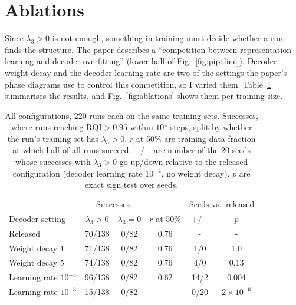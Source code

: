 \section{Ablations}
\label{sec:ablations}

Since $\lambda_3 > 0$ is not enough, something in training must decide whether
a run finds the structure. The paper
describes a ``competition between representation learning and decoder
overfitting'' (lower half of Fig.~\ref{fig:pipeline}). Decoder weight decay and the decoder
learning rate are two of the settings the paper's phase diagrams use to
control this competition, so I varied them. Table~\ref{tab:ablations}
summarises the results, and Fig.~\ref{fig:ablations} shows them per training
size.

\begin{table}[t]
  \centering
  \caption{All configurations, 220 runs each on the same training sets.
  Successes, where runs reaching $\mathrm{RQI}>0.95$ within $10^4$ steps, split by
  whether the run's training set has $\lambda_3>0$. $r$ at 50\% are training
  data fraction at which half of all runs succeed. $+$/$-$ are number of the 20 seeds whose successes with
  $\lambda_3>0$ go up/down relative to the released configuration (decoder
  learning rate $10^{-4}$, no weight decay). $p$ are exact sign test over seeds.}
  \label{tab:ablations}
  \small
  \setlength{\tabcolsep}{4pt}
  \begin{tabular}{@{}lccccc@{}}
    \toprule
    & \multicolumn{2}{c}{Successes} & & \multicolumn{2}{c}{Seeds vs.\ released} \\
    \cmidrule(lr){2-3} \cmidrule(l){5-6}
    Decoder setting & $\lambda_3{>}0$ & $\lambda_3{=}0$ & \shortstack{$r$ at\\50\%} & $+$/$-$ & $p$ \\
    \midrule
    Released & 70/138 & 0/82 & 0.76 & - & - \\
    Weight decay 1   & 71/138 & 0/82 & 0.76 & 1/0  & 1.0 \\
    Weight decay 5   & 74/138 & 0/82 & 0.76 & 4/0  & 0.13 \\
    Learning rate $10^{-5}$ & 96/138 & 0/82 & 0.62 & 14/2 & 0.004 \\
    Learning rate $10^{-3}$ & 15/138 & 0/82 & -   & 0/20 & $2{\times}10^{-6}$ \\
    \bottomrule
  \end{tabular}
\end{table}


